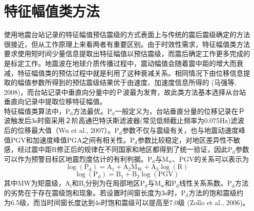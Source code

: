 \section{特征幅值类方法}

 \indent 使用地震台站记录的特征幅值预估震级的方式表面上与传统的震后震级确定的方法很接近，但从工作原理上来看两者有重要区别。由于时效性需求，特征幅值类方法要求使用短时间少量信息提取出特征幅值以预估震级，而震后确定工作更多完成的是标定工作。地震波在地球介质传播过程中，震动幅值会随着震中距的增大而衰减，特征幅值类的预估过程中就是利用了这种衰减关系。相同情况下由位移信息提取的幅值参数所得到的预估震级结果优于由速度、加速度信息所得的 (马强等, 2008)，而台站记录中垂直向分量中的Ｐ波最为发育，故此类方法基本选择从台站垂直向记录中提取位移特征幅值。\\
 \indent 特征幅值类算法中，$\mathrm{P}_{\mathrm{d}}$方法最优。$\mathrm{P}_{\mathrm{d}}$一般定义为，台站垂直分量的位移记录在Ｐ波触发后3s时窗采用２阶高通巴特沃斯滤波器(常见低频截止频率为0.075Hz)滤波后的位移最大值（Wu et al., 2007）。$\mathrm{P}_{\mathrm{d}}$参数不仅与震级有关，也与地震动速度峰值PGV和加速度峰值PGA之间有相关性。$\mathrm{P}_{\mathrm{d}}$参数比较稳定，对地区差异性不敏感，经过震中距R修正后的规律在不同国家和地区都得到了统一验证，因此$\mathrm{P}_{\mathrm{d}}$参数可以作为预警目标区地震烈度估计的有利判据。$\mathrm{P}_{\mathrm{d}}$与$\mathrm{M}_{\mathrm{w}}$、PGV的关系可以表示为\\
\begin{equation}
\log \left(\mathrm{P}_{\mathrm{d}}\right)=\mathrm{A}_{1}+\mathrm{A}_{2} \mathrm{M}_{\mathrm{W}}+\mathrm{A}_{3} \log (\mathrm{R})
\end{equation}
\begin{equation}
\log \left(\mathrm{P}_{\mathrm{d}}\right)=\mathrm{B}_{1}+\mathrm{B}_{2} \log (\mathrm{PGV})
\end{equation}
 其中MW为矩震级，$\mathrm{A}_{\mathrm{i}}$和$\mathrm{B}_{\mathrm{i}}$分别为在局部地区$\mathrm{P}_{\mathrm{d}}$与$\mathrm{M}_{\mathrm{w}}$和$\mathrm{P}_{\mathrm{d}}$线性关系系数。$\mathrm{P}_{\mathrm{d}}$方法的劣势在于存在震级饱和现象。若设置时间窗长度为3s时，$\mathrm{P}_{\mathrm{d}}$方法的饱和震级约为6.5级，而当时间窗长度达到4s时饱和震级可以提高至7.0级 (Zollo et al., 2006)。\\